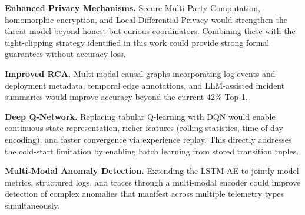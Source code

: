 \textbf{Enhanced Privacy Mechanisms.} Secure Multi-Party Computation,
homomorphic encryption, and Local Differential Privacy would strengthen the
threat model beyond honest-but-curious coordinators. Combining these with the
tight-clipping strategy identified in this work could provide strong formal
guarantees without accuracy loss.

\textbf{Improved RCA.} Multi-modal causal graphs incorporating log events
and deployment metadata, temporal edge annotations, and LLM-assisted incident
summaries would improve accuracy beyond the current 42\% Top-1.

\textbf{Deep Q-Network.} Replacing tabular Q-learning with DQN would enable
continuous state representation, richer features (rolling statistics,
time-of-day encoding), and faster convergence via experience replay. This
directly addresses the cold-start limitation by enabling batch learning from
stored transition tuples.

\textbf{Multi-Modal Anomaly Detection.} Extending the LSTM-AE to jointly
model metrics, structured logs, and traces through a multi-modal encoder
could improve detection of complex anomalies that manifest across multiple
telemetry types simultaneously.
